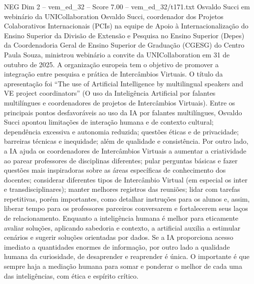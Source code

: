 \begin{textsample}{NEG Dim 2 – vem\_ed\_32 – Score 7.00 – vem\_ed\_32/t171.txt}  \label{ex:f2_neg_146}
Osvaldo Succi em webinário da UNICollaboration Osvaldo Succi, coordenador dos Projetos Colaborativos Internacionais (PCIs) na equipe de Apoio à Internacionalização do Ensino Superior da Divisão de Extensão e Pesquisa no Ensino Superior (Depes) da Coordenadoria Geral de Ensino Superior de Graduação (CGESG) do Centro Paula Souza, ministrou webinário a convite da UNICollaboration em 31 de outubro de 2025.
A organização europeia tem o objetivo de promover a integração entre pesquisa e prática de Intercâmbios Virtuais.
O título da apresentação foi “The use of Artificial Intelligence by multilingual speakers and VE project coordinators” (O uso da Inteligência Artificial por falantes multilíngues e coordenadores de projetos de Intercâmbios Virtuais).
Entre os principais pontos desfavoráveis ao uso da IA por falantes multilíngues, Osvaldo Succi apontou limitações de interação humana e de contexto cultural; dependência excessiva e autonomia reduzida; questões éticas e de privacidade; barreiras técnicas e inequidade; além de qualidade e consistência.
Por outro lado, a IA ajuda os coordenadores de Intercâmbios Virtuais a aumentar a criatividade ao parear professores de disciplinas diferentes; pular perguntas básicas e fazer questões mais inspiradoras sobre as áreas específicas de conhecimento dos docentes; considerar diferentes tipos de Intercâmbio Virtual (em especial os inter e transdisciplinares); manter melhores registros das reuniões; lidar com tarefas repetitivas, porém importantes, como detalhar instruções para os alunos e, assim, liberar tempo para os professores parceiros conversarem e fortalecerem seus laços de relacionamento.
Enquanto a inteligência humana é melhor para eticamente avaliar soluções, aplicando sabedoria e contexto, a artificial auxilia a estimular cenários e sugerir soluções orientadas por dados.
Se a IA proporciona acesso imediato a quantidades enormes de informação, por outro lado a qualidade humana da curiosidade, de desaprender e reaprender é única.
O importante é que sempre haja a mediação humana para somar e ponderar o melhor de cada uma das inteligências, com ética e espírito crítico.

\end{textsample}
